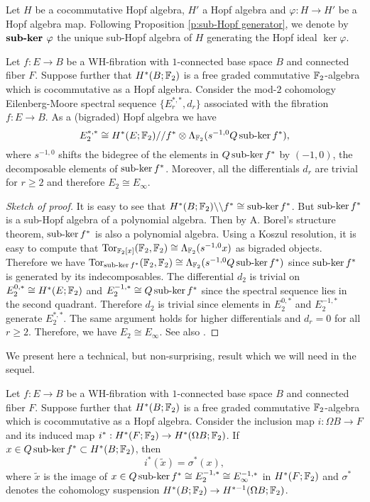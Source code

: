 \begin{defn}
Let $H$ be a cocommutative Hopf algebra, $H'$ a Hopf algebra and $\varphi:H\to H'$ be a Hopf algebra map. Following Proposition \ref{p:sub-Hopf generator}, we denote by $\text{\bf sub-ker }\mathbf\varphi$ the unique sub-Hopf algebra of $H$ generating the Hopf ideal $\ker\varphi$.
\end{defn}

\begin{cor}\label{c:main EMSS}
Let $f:E\to B$ be a WH-fibration with $1$-connected base space $B$ and connected fiber $F$. Suppose further that $H^*(B;\mathbb{F}_2)$ is a free graded commutative $\mathbb{F}_2$-algebra which is cocommutative as a Hopf algebra. Consider the mod-$2$ cohomology Eilenberg-Moore spectral sequence $\{E_r^{*,*},d_r\}$ associated with the fibration $f:E\to B$. As a (bigraded) Hopf algebra we have
$$
E_2^{*,*}\cong H^*(E;\mathbb{F}_2)//f^*\otimes\Lambda_{\mathbb{F}_2}(s^{-1,0}Q\operatorname{sub-ker} f^*),
$$ where $s^{-1,0}$ shifts the bidegree of the elements in $Q\operatorname{sub-ker} f^*$ by $(-1,0)$, the decomposable elements of $\operatorname{sub-ker} f^*$. Moreover, all the differentials $d_r$ are trivial for $r\geq2$ and therefore $E_2\cong E_\infty$.
\end{cor}

\begin{proof}[Sketch of proof]
It is easy to see that $H^*(B;\mathbb{F}_2)\backslash\backslash f^*\cong\operatorname{sub-ker} f^*$. But $\operatorname{sub-ker} f^*$ is a sub-Hopf algebra of a polynomial algebra. Then by A. Borel's structure theorem, $\operatorname{sub-ker} f^*$ is also a polynomial algebra. Using a Koszul resolution, it is easy to compute that $\operatorname{Tor}_{\mathbb{F}_2[x]}(\mathbb{F}_2,\mathbb{F}_2)\cong\Lambda_{\mathbb{F}_2}(s^{-1,0}x)$ as bigraded objects. Therefore we have $\operatorname{Tor}_{\operatorname{sub-ker} f^*}(\mathbb{F}_2,\mathbb{F}_2)\cong\Lambda_{\mathbb{F}_2}(s^{-1,0}Q\operatorname{sub-ker} f^*)$ since $\operatorname{sub-ker} f^*$ is generated by its indecomposables. The differential $d_2$ is trivial on $E_2^{0,*}\cong H^*(E;\mathbb{F}_2)$ and $E_2^{-1,*}\cong Q\operatorname{sub-ker} f^*$ since the spectral sequence lies in the second quadrant. Therefore $d_2$ is trivial since elements in $E_2^{0,*}$ and $E_2^{-1,*}$ generate $E_2^{*,*}$. The same argument holds for higher differentials and $d_r=0$ for all $r\geq2$. Therefore, we have $E_2\cong E_\infty$. See also \cite[Theorem 3.2, pp. 75-76]{Sm70}.
\end{proof}

We present here a technical, but non-surprising, result which we will need in the sequel.

\begin{thm}\label{t:EMSS and cohomology suspension}
Let $f:E\to B$ be a WH-fibration with $1$-connected base space $B$ and connected fiber $F$. Suppose further that $H^*(B;\mathbb{F}_2)$ is a free graded commutative $\mathbb{F}_2$-algebra which is cocommutative as a Hopf algebra. Consider the inclusion map $i:\Omega B\to F$ and its induced map $i^*:H^*(F;\mathbb{F}_2)\to H^*(\Omega B;\mathbb{F}_2)$. If $x\in Q\operatorname{sub-ker} f^*\subset H^*(B;\mathbb{F}_2)$, then 
$$i^*(\tilde{x})=\sigma^*(x),$$ 
where $\tilde{x}$ is the image of $x\in Q\operatorname{sub-ker} f^*\cong E_2^{-1,*}\cong E_\infty^{-1,*}$ in $H^*(F;\mathbb{F}_2)$ and $\sigma^*$ denotes the cohomology suspension $H^*(B;\mathbb{F}_2)\to H^{*-1}(\Omega B;\mathbb{F}_2)$.
\end{thm}

